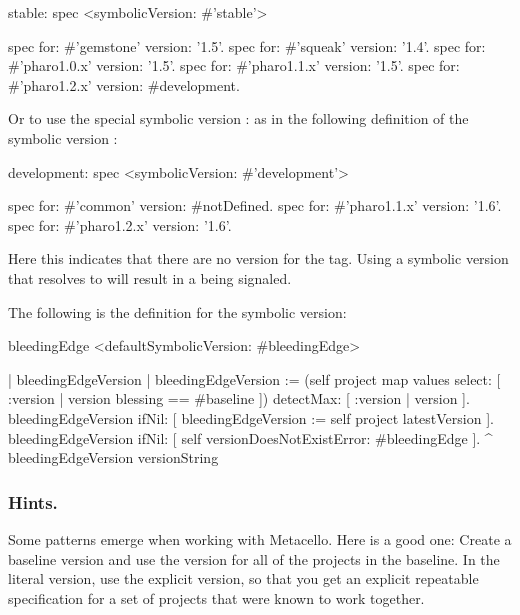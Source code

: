 \documentclass[a4paper,10pt,twoside]{book}
\begin{document}
\begin{code}{}
stable: spec
       <symbolicVersion: #'stable'>

       spec for: #'gemstone' version: '1.5'.
       spec for: #'squeak' version: '1.4'.
       spec for: #'pharo1.0.x' version: '1.5'.
       spec for: #'pharo1.1.x' version: '1.5'.
       spec for: #'pharo1.2.x' version: #development.
\end{code}

Or to use the special symbolic version : as in the following definition of the symbolic version :

\begin{code}{}
development: spec
       <symbolicVersion: #'development'>

       spec for: #'common' version: #notDefined.
       spec for: #'pharo1.1.x' version: '1.6'.
       spec for: #'pharo1.2.x' version: '1.6'.
\end{code}

Here this indicates that there are no version for the  tag. 
Using a symbolic version that resolves to  will result in a  being signaled.

The following is the definition for the  symbolic version: 

\begin{code}{}
bleedingEdge
       <defaultSymbolicVersion: #bleedingEdge>

       | bleedingEdgeVersion |
       bleedingEdgeVersion := (self project map values select: [ :version |
version blessing == #baseline ])
              detectMax: [ :version | version ].
       bleedingEdgeVersion ifNil: [ bleedingEdgeVersion := self project
latestVersion ].
       bleedingEdgeVersion
              ifNil: [ self versionDoesNotExistError: #bleedingEdge ].
       ^ bleedingEdgeVersion versionString
\end{code}


\subsubsection{Hints.}
Some patterns emerge when working with Metacello. Here is a good one: 
Create a baseline version and use the  version for all of the projects in the baseline. In the literal version, use the explicit version, so that you get an explicit repeatable specification for a set of projects that were known to work together.
\end{document}
